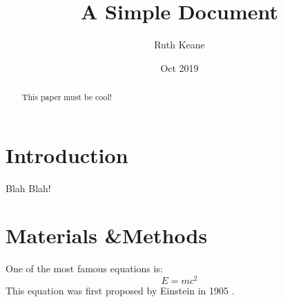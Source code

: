 \documentclass[12pt]{article}
\title{A Simple Document}
\author{Ruth Keane}
\date{Oct 2019}
\begin{document}
    \maketitle

    \begin{abstract}
        This paper must be cool!
    \end{abstract}
    \section{Introduction}
    Blah Blah!
    \section{Materials \&Methods}
    One of the most famous equations is:
    \begin{equation}
     E=mc^2
    \end{equation}
     This equation was first proposed by Einstein in 1905
     \cite{einstein1905does}.
     
     
\end{document}
